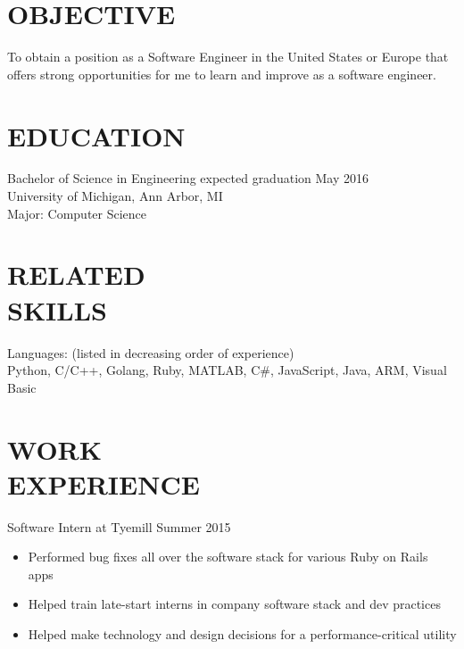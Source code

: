 \documentclass[line,margin]{res}
\begin{document}

\color{HeaderColor}
\address{\hfill ajlj@umich.edu -- 248-716-5054}
\address{23613 Stonehenge Blvd - Novi, MI - 48375}

 
 \renewcommand{\labelitemi}{$-$}
 
\begin{resume}
\color{black}
\section{\textcolor{HeaderColor}{OBJECTIVE}}
				To obtain a position as a Software Engineer in the United States or Europe that offers strong opportunities for me to learn and improve as a software engineer.

\section{\textcolor{HeaderColor}{EDUCATION}} {\sc Bachelor of Science in Engineering} \hfill expected graduation May 2016\\
				University of Michigan, Ann Arbor, MI \\
                Major: Computer Science \\
 
\section{\textcolor{HeaderColor}{RELATED \\ SKILLS}} 
				{\sc Languages: (listed in decreasing order of experience)} \\
				Python, C/C++, Golang, Ruby, MATLAB, C\#, JavaScript, Java, ARM, Visual Basic \\
 
\section{\textcolor{HeaderColor}{WORK \\ EXPERIENCE}} 
                {\sc Software Intern at Tyemill} \hfill Summer 2015
                 \begin{itemize}  \itemsep -2pt %
                 \item Performed bug fixes all over the software stack for various Ruby on Rails apps
	      \item Helped train late-start interns in company software stack and dev practices
	      \item Helped make technology and design decisions for a performance-critical utility
                 \end{itemize}


\end{resume}
\end{document}

